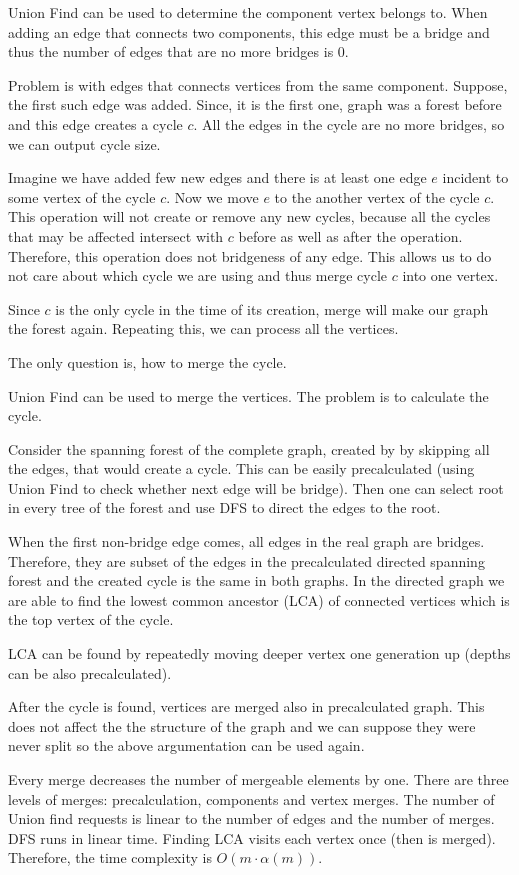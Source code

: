 
Union Find can be used to determine the component vertex belongs to.
When adding an edge that connects two components, this edge must
be a bridge and thus the number of edges that are no more bridges is $0$.

Problem is with edges that connects vertices from the same component.
Suppose, the first such edge was added. Since, it is the first one,
graph was a forest before and this edge creates a cycle $c$. All the edges
in the cycle are no more bridges, so we can output cycle size.

Imagine we have added few new edges and there is at least one edge $e$
incident to some vertex of the cycle $c$. Now we move $e$ to the another
vertex of the cycle $c$. This operation will not create or remove any
new cycles, because all the cycles that may be affected intersect with $c$
before as well as after the operation. Therefore, this operation does not
bridgeness of any edge. This allows us to do not care
about which cycle we are using and thus merge cycle $c$ into one vertex.

Since $c$ is the only cycle in the time of its creation,
merge will make our graph the forest again.
Repeating this, we can process all the vertices.

The only question is, how to merge the cycle.


Union Find can be used to merge the vertices. The problem is to
calculate the cycle.

Consider the spanning forest of the complete graph, created by
by skipping all the edges, that would create a cycle. This can be easily
precalculated (using Union Find to check whether next edge will be bridge).
Then one can select root in every tree of the forest and use DFS
to direct the edges to the root.

When the first non-bridge edge comes, all edges in the real graph
are bridges. Therefore, they are subset of the edges in the precalculated
directed spanning forest and the created cycle is the same in both graphs.
In the directed graph we are able to find the lowest common ancestor (LCA) of
connected vertices which is the top vertex of the cycle.

LCA can be found by repeatedly moving deeper vertex one generation up
(depths can be also precalculated).

After the cycle is found, vertices are merged also in precalculated graph.
This does not affect the the structure of the graph and we can suppose
they were never split so the above argumentation can be used again.

Every merge decreases the number of mergeable elements by one.
There are three levels of merges: precalculation, components and vertex
merges. The number of Union find requests is linear to the number of edges
and the number of merges. DFS runs in linear time. Finding LCA visits
each vertex once (then is merged). Therefore, the time complexity
is $O(m\cdot \alpha(m))$.
